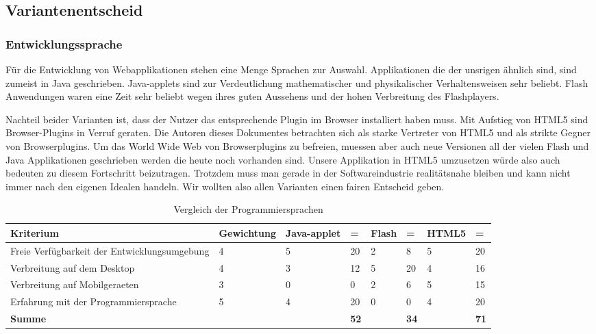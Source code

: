 \documentclass[11pt,paper=a4,final]{scrartcl}
\begin{document}
\subsection{Variantenentscheid}
\subsubsection{Entwicklungssprache}
F\"ur die Entwicklung von Webapplikationen stehen eine Menge Sprachen zur
Auswahl. Applikationen die der unsrigen \"ahnlich sind, sind zumeist in Java
geschrieben. Java-applets sind zur Verdeutlichung mathematischer und
physikalischer Verhaltensweisen sehr beliebt. Flash Anwendungen waren eine Zeit
sehr beliebt wegen ihres guten Aussehens und der hohen Verbreitung des
Flashplayers.

Nachteil beider Varianten ist, dass der Nutzer das entsprechende Plugin im
Browser installiert haben muss. Mit Aufstieg von HTML5 sind Browser-Plugins in
Verruf geraten.
Die Autoren dieses Dokumentes betrachten sich als starke Vertreter von HTML5 und
als strikte Gegner von Browserplugins. Um das World Wide Web von Browserplugins
zu befreien, muessen aber auch neue Versionen all der vielen Flash und Java
Applikationen geschrieben werden die heute noch vorhanden sind. Unsere
Applikation in HTML5 umzusetzen w\"urde also auch bedeuten zu diesem Fortschritt
beizutragen. Trotzdem muss man gerade in der Softwareindustrie realit\"atsnahe
bleiben und kann nicht immer nach den eigenen Idealen handeln. Wir wollten also
allen Varianten einen fairen Entscheid geben.

\begin{table}[h!]
  \centering
  \begin{tabular}{|p{5cm}|l|l|l|l|l|l|l|} \hline
    \bf Kriterium & \bf Gewichtung & \bf Java-applet & \bf = & \bf Flash &
    \bf = & \bf HTML5 & \bf = \\ \hline
    Freie Verf\"ugbarkeit der Entwicklungsumgebung
    					  & 4 & 5 & 20 & 2 & 8  & 5 & 20 \\ \hline
    Verbreitung auf dem Desktop           & 4 & 3\cite{heise:bsi-java}
    \cite{heise:moz-app-java} & 12 & 5 & 20 & 4 & 16 \\ \hline
    Verbreitung auf Mobilgeraeten         & 3 & 0 & 0  & 2 & 6  & 5 & 15 \\ \hline
    Erfahrung mit der Programmiersprache  & 5 & 4 & 20 & 0 & 0  & 4 & 20 \\ \hline
    \bf Summe 				  &   &   & \cellcolor{red!80!} \bf 52 &   &
    \cellcolor{red!80!}\bf  34 &   & \cellcolor{green!80!}\bf 71 \\
    \hline
  \end{tabular}
  \caption{Vergleich der Programmiersprachen}
  \label{tab:langs}
\end{table}
\end{document}
